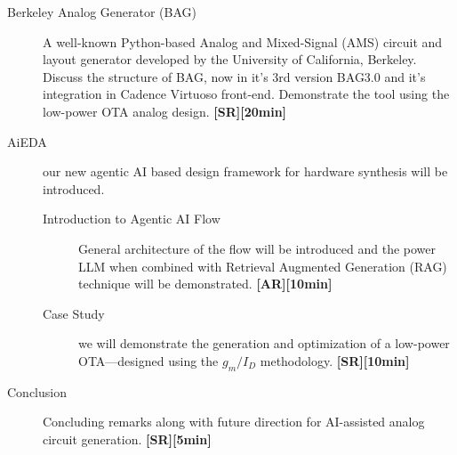 \documentclass[12pt]{article}
\begin{document}
\begin{description}
    \item[Berkeley Analog Generator (BAG)] A well-known Python-based Analog and Mixed-Signal (AMS) circuit and layout generator developed by the University of California, Berkeley. Discuss the structure of BAG, now in it's 3rd version BAG3.0 and it's integration in Cadence Virtuoso front-end. Demonstrate the tool using the low-power OTA analog design. \textbf{[SR][20min]}

    \item[AiEDA] our new agentic AI based design framework for hardware synthesis will be introduced. 
    \begin{description}
        \item[Introduction to Agentic AI Flow] General architecture of the flow will be introduced and the power LLM when combined with Retrieval Augmented Generation (RAG) technique will be demonstrated. \textbf{[AR][10min]}

        \item[Case Study] we will demonstrate the generation and optimization of a low-power OTA—designed using the $g_m/I_D$ methodology. \textbf{[SR][10min]}
    \end{description}

    \item[Conclusion] Concluding remarks along with future direction for AI-assisted analog circuit generation. \textbf{[SR][5min]}
    
\end{description}

%
%
\end{document}
